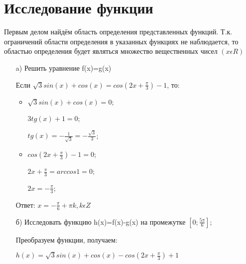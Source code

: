 \documentclass[russian,utf8,nocolumnxxxi,nocolumnxxxii]{eskdtext}
\begin{document}
\newpage
\section{Исследование функции}
Первым делом найдём область определения представленных функций. Т.к. ограничений области определения в указанных функциях не наблюдается, то областью определения будет являться множество вещественных чисел $(x \epsilon R)$
\begin{enumerate}
    \item[a)]Решить уравнение f(x)=g(x)
    
   Если $\sqrt{3}sin(x)+cos(x)=cos(2x+\frac{\pi}{3})-1$,
   то:
   \begin{itemize}
   \renewcommand{\labelitemi}{$\bullet$}
       \item $\sqrt{3}sin(x)+cos(x)=0$;
       
       $3tg(x)+1=0$;
       
       $tg(x)=-\frac{1}{\sqrt{3}}=-\frac{\sqrt{3}}{3}$;
       
       \item $cos(2x+\frac{\pi}{3})-1=0$;
       
       $2x+\frac{\pi}{3}=arccos 1=0$;
       
       $2x=-\frac{\pi}{3}$;

   \end{itemize}
   
 Ответ: $x=-\frac{\pi}{6}+\pi k,  k \epsilon Z$
    
    
    \item[б)] Исследовать функцию h(x)=f(x)-g(x) на промежутке $[0;\frac{5\pi}{6}]$;
    
    Преобразуем функции, получаем:
    
    $h(x) = \sqrt{3}sin(x)+cos(x)-cos(2x+\frac{\pi}{3})+1$
    
    
    
    

\end{enumerate}
\end{document}
